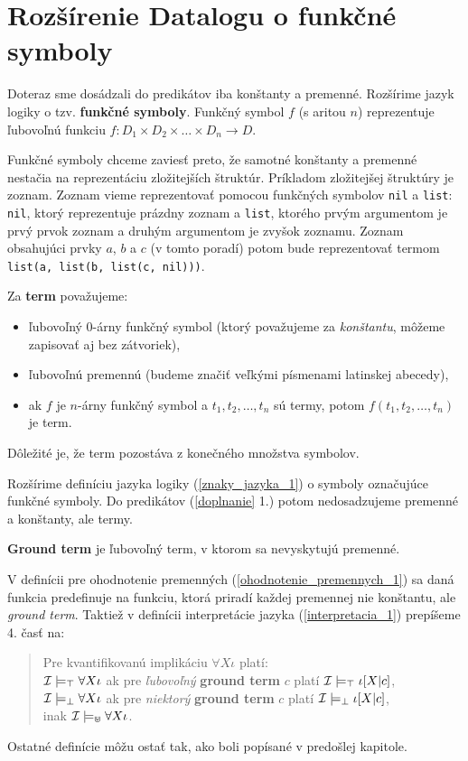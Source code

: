 \section{Rozšírenie Datalogu o funkčné symboly}
Doteraz sme dosádzali do predikátov iba konštanty a premenné. Rozšírime jazyk logiky o tzv. \textbf{funkčné
symboly}. Funkčný symbol $f$ (s aritou $n$) reprezentuje ľubovoľnú funkciu $f: D_1 \times D_2 \times
\dots \times D_n \to D$.

Funkčné symboly chceme zaviesť preto, že samotné konštanty a premenné nestačia na reprezentáciu
zložitejších štruktúr. Príkladom zložitejšej štruktúry je zoznam. Zoznam vieme reprezentovať pomocou
funkčných symbolov \verb|nil| a \verb|list|: \verb|nil|, ktorý reprezentuje prázdny zoznam a
\verb|list|, ktorého prvým argumentom je prvý prvok zoznam a druhým argumentom je zvyšok zoznamu.
Zoznam obsahujúci prvky $a$, $b$ a $c$ (v tomto poradí) potom bude reprezentovať termom
\verb|list(a, list(b, list(c, nil)))|.

\begin{definition}
Za \textbf{term} považujeme:
\begin{itemize}
    \item ľubovoľný 0-árny funkčný symbol (ktorý považujeme za \textit{konštantu}, môžeme zapisovať
    aj bez zátvoriek),
    \item ľubovoľnú premennú (budeme značiť veľkými písmenami latinskej abecedy),
    \item ak $f$ je $n$-árny funkčný symbol a $t_1, t_2, \dots, t_n$ sú termy, potom 
    $f(t_1, t_2, \dots, t_n)$ je term.
\end{itemize}
Dôležité je, že term pozostáva z konečného množstva symbolov.
\end{definition}

Rozšírime definíciu jazyka logiky (\ref{znaky_jazyka_1}) o symboly označujúce funkčné symboly. Do
predikátov (\ref{doplnanie} 1.) potom nedosadzujeme premenné a konštanty, ale termy.

\begin{definition}
\textbf{Ground term} je ľubovoľný term, v ktorom sa nevyskytujú premenné.
\end{definition}

V definícii pre ohodnotenie premenných (\ref{ohodnotenie_premennych_1}) sa daná funkcia predefinuje
na funk\-ciu, ktorá priradí každej premennej nie konštantu, ale \textit{ground term}. Taktiež v
definícii interpretácie jazyka (\ref{interpretacia_1}) prepíšeme 4. časť na:

\begin{quote}
Pre kvantifikovanú implikáciu $\forall X \iota$ platí:\\
$\mathcal{I} \models_\top \forall X \iota$ ak pre \textit{ľubovoľný} \textbf{ground term} $c$ platí
$\mathcal{I} \models_\top \iota[X|c]$,\\
$\mathcal{I} \models_\bot \forall X \iota$ ak pre \textit{niektorý} \textbf{ground term} $c$ platí
$\mathcal{I} \models_\bot \iota[X|c]$,\\
inak $\mathcal{I} \models_\Cup \forall X \iota$. 
\end{quote}

Ostatné definície môžu ostať tak, ako boli popísané v predošlej kapitole.